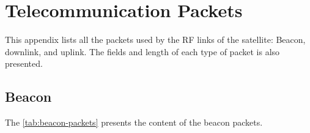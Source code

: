 %
%
%
%
%

%
%
%
%
%
%

\chapter{Telecommunication Packets} \label{anx:packets}

This appendix lists all the packets used by the RF links of the satellite: Beacon, downlink, and uplink. The fields and length of each type of packet is also presented.

\section{Beacon}

The \autoref{tab:beacon-packets} presents the content of the beacon packets.

